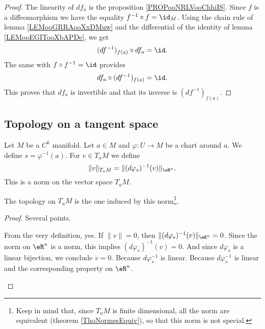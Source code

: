 \begin{proof}
	The linearity of \( df_a\) is the proposition \ref{PROPooNRLVooChhiIS}. Since \( f\) is a diffeomorphism we have the equality \( f^{-1}\circ f=\id_M\). Using the chain rule of lemma \ref{LEMooGRRAooXxDMuw} and the differential of the identity of lemma \ref{LEMooEGITooXbAPDe}, we get
	\begin{equation}
		(df^{-1})_{f(a)}\circ df_a=\id.
	\end{equation}
	The same with \( f\circ f^{-1}=\id\) provides
	\begin{equation}
		df_a\circ(df^{-1})_{f(a)}=\id.
	\end{equation}
	This proves that \( df_a\) is invertible and that its inverse is \( (df^{-1})_{f(a)}\).
\end{proof}

\subsection{Topology on a tangent space}

\begin{propositionDef}        \label{PROPooHJOXooMGANfd}
	Let \( M\) be a \( C^k\) manifold. Let \( a\in M\) and \( \varphi\colon U\to M\) be a chart around \( a\). We define \( s=\varphi^{-1}(a)\). For \( v\in T_aM\) we define
	\begin{equation}
		\| v \|_{T_aM}=\| (d\varphi_s)^{-1}(v) \|_{\eR^n}.
	\end{equation}
	This is a norm on the vector space \( T_aM\).

	The topology on \( T_aM\) is the one induced by this norm\footnote{Keep in mind that, since \( T_aM\) is finite dimensional, all the norm are equivalent (theorem \ref{ThoNormesEquiv}), so that this norm is not special.}.
\end{propositionDef}

\begin{proof}
	Several points.
	\begin{subproof}
		\spitem[\( \| v \|\geq 0\)]
		From the very definition, yes.
		\spitem[\( \| v \|=0\) si et seulement si \( v=0\)]
		If \( \| v \|=0\), then \( \| (d\varphi_s)^{-1}(v) \|_{\eR^n}=0\). Since the norm on \( \eR^n\) is a norm, this implies \( (d\varphi_s)^{-1}(v)=0\). And since \( d\varphi_s\) is a linear bijection, we conclude \( v=0\).
		\spitem[\( \| \lambda v \|=| \lambda |\| v \|\)]
		Because \( d\varphi_s^{-1}\) is linear.
		\spitem[\( \| v+w \|\leq \| v \|+\| v \|\)]
		Because \( d\varphi_s^{-1}\) is linear and the corresponding property on \( \eR^n\).
	\end{subproof}
\end{proof}

